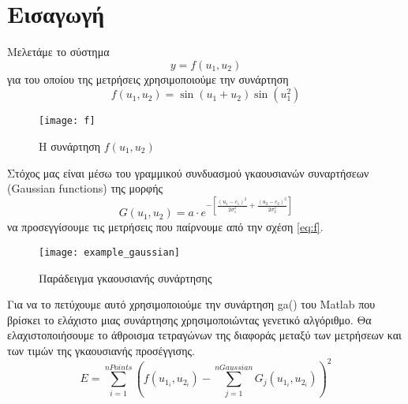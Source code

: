 \chapter{Εισαγωγή} \label{ch:intro}

Μελετάμε το σύστημα
\begin{equation}
	y = f(u_1, u_2)
\end{equation}
για του οποίου της μετρήσεις χρησιμοποιούμε την συνάρτηση
\begin{equation}
	f(u_1, u_2) = \sin{(u_1 + u_2)}\sin{(u_1^2)}
	\label{eq:f}
\end{equation}

\begin{figure}[htbp]
	\centerfloat	
	\texttt{[image: f]}
	\caption{Η συνάρτηση $f(u_1, u_2)$}
	\label {fig:f_mesh_plot}
\end{figure}

Στόχος μας είναι μέσω του γραμμικού συνδυασμού γκαουσιανών συναρτήσεων (Gaussian functions) της μορφής
\begin{equation}
	G(u_1, u_2) = a \cdot e^{-[\frac{(u_1 - c_1)^2}{2\sigma_{1}^2} + \frac{(u_2 - c_2)^2}{2\sigma_{2}^2}]}
\end{equation}
να προσεγγίσουμε τις μετρήσεις που παίρνουμε από την σχέση \ref{eq:f}.

\begin{figure}
	\centerfloat	
	\texttt{[image: example\_gaussian]}
	\caption{Παράδειγμα γκαουσιανής συνάρτησης}
	\label {fig:example-gaussian}
\end{figure}

Για να το πετύχουμε αυτό χρησιμοποιούμε την συνάρτηση ga() του Matlab που βρίσκει το ελάχιστο μιας συνάρτησης χρησιμοποιώντας γενετικό αλγόριθμο. 
Θα ελαχιστοποιήσουμε το άθροισμα τετραγώνων της διαφοράς μεταξύ των μετρήσεων και των τιμών της γκαουσιανής προσέγγισης.
\begin{equation}
	E = \sum_{i = 1}^{nPoints}(f(u_{1_i}, u_{2_i}) - \sum_{j = 1}^{nGaussian}G_j(u_{1_i}, u_{2_i}))^2
\end{equation}